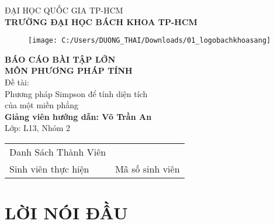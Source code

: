 \documentclass[14pt,a4paper]{article}
\begin{document}
\cleardoublepage
\thispagestyle{empty}
\begin{titlepage}
\begin{center}
	\fontsize{16pt}{0pt}\selectfont ĐẠI HỌC QUỐC GIA TP-HCM\\
	\vspace{6pt}\textbf{\fontsize{16pt}{0pt}\selectfont TRƯỜNG ĐẠI HỌC BÁCH KHOA TP-HCM\\}
	\vspace{0.3cm}
	\begin{figure}[H]
		\centering
\texttt{[image: C:/Users/DUONG\_THAI/Downloads/01\_logobachkhoasang]}
	\end{figure}
	\vspace{0.3cm}
	\textbf{\fontsize{20pt}{0pt}\selectfont BÁO CÁO BÀI TẬP LỚN\\}
	\vspace{0.2cm}
	\textbf{\fontsize{18pt}{0pt}\selectfont MÔN PHƯƠNG PHÁP TÍNH\\}
	\vspace{0.2cm}
\fontsize{20pt}{0pt}\selectfont Đề tài:\\

	\fontsize{22pt}{0pt}\selectfont Phương pháp Simpson để tính diện tích \\
	\fontsize{22pt}{0pt}\selectfont của một miền phẳng\\
	\vspace{0.5cm}
	\textbf{\fontsize{20pt}{0pt}\selectfont Giảng viên hướng dẫn: Võ Trần An\\}
	\vspace{0.2cm}
	\fontsize{20pt}{0pt}\selectfont Lớp: L13, Nhóm 2\\
	\vspace{0.5cm}
	\begin{tabular}{l l}
		\fontsize{16pt}{0pt}\selectfont Danh Sách Thành Viên \vspace{6pt}\\
		\fontsize{16pt}{0pt}\selectfont Sinh viên thực hiện & \fontsize{16pt}{0pt}\selectfont Mã số sinh viên\\
	\end{tabular}
\end{center}
\end{titlepage}
\cleardoublepage
\section*{LỜI NÓI ĐẦU}
\end{document}
